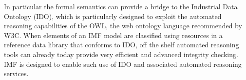 \documentclass[../main.tex]{subfiles}
\begin{document}
In particular the formal semantics can provide a bridge to the
Industrial Data Ontology (IDO), which is particularly designed to
exploit the automated reasoning capabilities of the OWL, the web
ontology language recommended by W3C.  When elements of an IMF model
are classified using resources in a reference data library that
conforms to IDO, off the shelf automated reasoning tools can already
today provide very efficient and advanced integrity checking. IMF is
designed to enable such use of IDO and associated automated reasoning
services.

\end{document}
